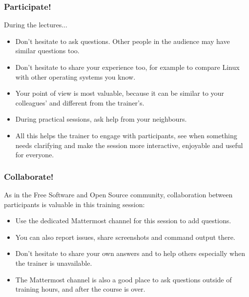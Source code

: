 \begin{frame}

\frametitle{Participate!}
During the lectures...
\begin{itemize}
\item Don't hesitate to ask questions. Other people in the audience may have
similar questions too.
\item Don't hesitate to share your experience too, for example to compare Linux
with other operating systems you know.
\item Your point of view is most valuable, because it can be similar to your
colleagues' and different from the trainer's.
\item During practical sessions, ask help from your neighbours.
\item All this helps the trainer to engage with participants, see when
something needs clarifying and make the session more interactive, enjoyable
and useful for everyone.
\end{itemize}
\end{frame}

\begin{frame}
\frametitle{Collaborate!}
  As in the Free Software and Open Source community,
  collaboration between participants is valuable in this training session:
  \begin{itemize}
    \item Use the dedicated Mattermost channel for this session
	  to add questions.
    \item You can also report issues, share screenshots and command output there.
    \item Don't hesitate to share your own answers and to help others
          especially when the trainer is unavailable.
    \item The Mattermost channel is also a good place to ask questions
	  outside of training hours, and after the course is over.
    \end{itemize}
\end{frame}
